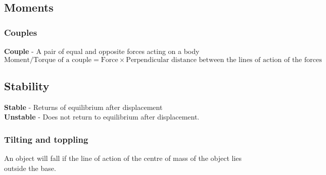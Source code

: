 \documentclass{article}[18pt]
\begin{document}
\subsection{Moments}
\subsubsection{Couples}
\textbf{Couple} - A pair of equal and opposite forces acting on a body\\
$$\text{Moment/Torque of a couple}=\text{Force}\times\text{Perpendicular distance between the lines of action of the forces}$$
\subsection{Stability}
\textbf{Stable} - Returns of equilibrium after displacement\\
\textbf{Unstable} - Does not return to equilibrium after displacement.
\subsubsection{Tilting and toppling}
An object will fall if the line of action of the centre of mass of the object lies outside the base.
\end{document}
